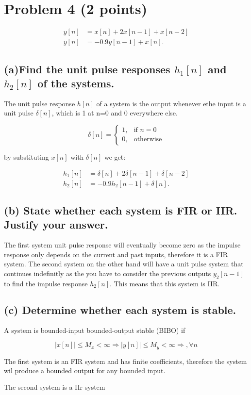 \section{Problem 4 (2 points)}

\begin{align*}
    y[n]&=x[n]+2 x[n-1]+x[n-2] \\y[n]&=-0.9 y[n-1]+x[n] .
\end{align*}

\subsection*{(a)Find the unit pulse responses $h_1[n]$ and $h_2[n]$ of the systems.}

The unit pulse response $h[n]$ of a system is the output whenever ethe input is a unit pulse $\delta[n]$, which is 1 at n=0 and 0 everywhere else.

\begin{equation*}
    \delta[n] = 
    \begin{cases} 
        1, & \text{if } n = 0 \\
        0, & \text{otherwise}
    \end{cases}
\end{equation*}

by substituting $x[n]$ with $\delta[n]$ we get:

\begin{align*}
    h_1[n]&=\delta[n]+2 \delta[n-1]+\delta[n-2] \\h_2[n]&=-0.9 h_2[n-1]+\delta[n] .
\end{align*}

\subsection*{(b) State whether each system is FIR or IIR. Justify your answer.}

The first system unit pulse response will eventually become zero as the impulse response only depends on the current and past inputs, therefore it is a FIR system. The second system on the other hand will have a unit pulse system that continues indefinitly as the you have to consider the previous outputs $y_2[n-1]$ to find the impulse response $h_2[n]$. This means that this system is IIR.

\subsection*{(c) Determine whether each system is stable.}

A system is bounded-input bounded-output stable (BIBO) if

\begin{equation*}
    |x[n]| \leq M_{x}<\infty \Rightarrow|y[n]| \leq M_{y}<\infty \Rightarrow, \forall n
\end{equation*}

The first system is an FIR system and has finite coefficients, therefore the system wil produce a bounded output for any bounded input.

The second system is a IIr system
